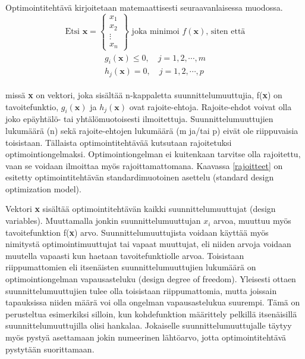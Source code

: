 \documentclass[12pt]{article}
\newenvironment{content}{\pagenumbering{arabic}}{}
\begin{document}
\begin{content}
Optimointitehtävä kirjoitetaan matemaattisesti seuraavanlaisessa muodossa.
\begin{equation*}
\text{Etsi } \textbf{x} = 
\begin{Bmatrix} 
x_1 \\ 
x_2 \\ 
\vdots \\
x_n  
\end{Bmatrix}
\text{    joka minimoi } f(\textbf{x}) \text{, siten että}
\end{equation*}
\begin{align}
\label{rajoitteet}
\begin{split}
g_i(\textbf{x}) \leq 0, \quad j = 1,2, \cdots , m  \\ 
h_j(\textbf{x}) = 0, \quad j = 1,2, \cdots , p
\end{split}
\end{align}

missä \textbf{x} on vektori, joka sisältää n-kappaletta suunnittelumuuttujia, f(\textbf{x}) on tavoitefunktio, $g_i(\textbf{x})$ ja $h_j(\textbf{x})$ ovat rajoite-ehtoja. Rajoite-ehdot voivat olla joko epäyhtälö- tai yhtälömuotoisesti ilmoitettuja. Suunnittelumuuttujien lukumäärä (n) sekä rajoite-ehtojen lukumäärä (m ja/tai p) eivät ole riippuvaisia toisistaan. Tällaista optimointitehtävää kutsutaan rajoitetuksi optimointiongelmaksi. Optimointiongelman ei kuitenkaan tarvitse olla rajoitettu, vaan se voidaan ilmoittaa myös rajoittamattomana. Kaavassa \eqref{rajoitteet} on esitetty optimointitehtävän standardimuotoinen asettelu (standard design optimization model). \parencite[6]{engopt}

Vektori \textbf{x} sisältää optimointitehtävän kaikki suunnittelumuuttujat (design variables). Muuttamalla jonkin suunnittelumuuttujan $x_i$ arvoa, muuttuu myös tavoitefunktion f(\textbf{x}) arvo. Suunnittelumuuttujista voidaan käyttää myös nimitystä optimointimuuttujat tai vapaat muuttujat, eli niiden arvoja voidaan muutella vapaasti kun haetaan tavoitefunktiolle arvoa. Toisistaan riippumattomien eli itsenäisten suunnittelumuuttujien lukumäärä on optimointiongelman vapausasteluku (design degree of freedom). Yleisesti ottaen suunnittelumuuttujien tulee olla toisistaan riippumattomia, mutta joissain tapauksissa niiden määrä voi olla ongelman vapausastelukua suurempi. Tämä on perusteltua esimerkiksi silloin, kun kohdefunktion määrittely pelkillä itsenäisillä suunnittelumuuttujilla olisi hankalaa. Jokaiselle suunnittelumuuttujalle täytyy myös pystyä asettamaan jokin numeerinen lähtöarvo, jotta optimointitehtävä pystytään suorittamaan. 


\end{content}
\end{document}
